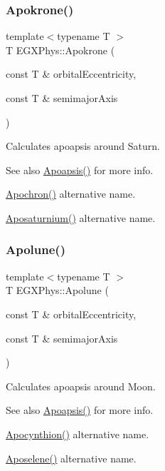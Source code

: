 \subsubsection{\texorpdfstring{Apokrone()}{Apokrone()}}
{\footnotesize\ttfamily template$<$typename T $>$ \\
T E\+G\+X\+Phys\+::\+Apokrone (\begin{DoxyParamCaption}\item[{const T \&}]{orbital\+Eccentricity,  }\item[{const T \&}]{semimajor\+Axis }\end{DoxyParamCaption})}



Calculates apoapsis around Saturn. 

\begin{DoxySeeAlso}{See also}
\hyperlink{group___e_g_x_phys-_apoapsis_gaf962e650bf84a568458e8eb39b1c61ba}{Apoapsis()} for more info. 

\hyperlink{group___e_g_x_phys-_apoapsis_gae4ea146039e6f32022321f0998e715e8}{Apochron()} alternative name. 

\hyperlink{group___e_g_x_phys-_apoapsis_gac157adc20a88c8616e4822eb819f9016}{Aposaturnium()} alternative name. 
\end{DoxySeeAlso}
\mbox{\label{group___e_g_x_phys-_apoapsis_gacc68b49812c38394611e1ef3a8bf0e3e}} 
\subsubsection{\texorpdfstring{Apolune()}{Apolune()}}
{\footnotesize\ttfamily template$<$typename T $>$ \\
T E\+G\+X\+Phys\+::\+Apolune (\begin{DoxyParamCaption}\item[{const T \&}]{orbital\+Eccentricity,  }\item[{const T \&}]{semimajor\+Axis }\end{DoxyParamCaption})}



Calculates apoapsis around Moon. 

\begin{DoxySeeAlso}{See also}
\hyperlink{group___e_g_x_phys-_apoapsis_gaf962e650bf84a568458e8eb39b1c61ba}{Apoapsis()} for more info. 

\hyperlink{group___e_g_x_phys-_apoapsis_ga557bb4d1a0ce7f17aaa8f8de469d4f52}{Apocynthion()} alternative name. 

\hyperlink{group___e_g_x_phys-_apoapsis_gab61f3b2d6a5be3f62f5fb6dfdf802014}{Aposelene()} alternative name. 
\end{DoxySeeAlso}
\mbox{\label{group___e_g_x_phys-_apoapsis_ga83e866e2f887ff8eafbc3971d4cab8be}} 
